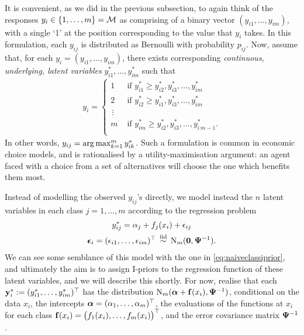 It is convenient, as we did in the previous subsection, to again think of the responses $y_i \in \{1,\dots,m\} = {\mathcal M}$ as comprising of a binary vector $(y_{i1},\dots,y_{im})$, with a single `1' at the position corresponding to the value that $y_i$ takes. 
In this formulation, each $y_{ij}$ is distributed as Bernoulli with probability $p_{ij}$. Now, assume that, for each $y_i = (y_{i1}, \dots, y_{im})$, there exists corresponding \emph{continuous, underlying, latent variables} $y_{i1}^*, \dots, y_{im}^*$ such that
\begin{align}\label{eq:latentmodel}
  y_i =
  \begin{cases}
    1 &\text{ if } y_{i1}^* \geq y_{i2}^*, y_{i3}^*, \dots, y_{im}^* \\
    2 &\text{ if } y_{i2}^* \geq y_{i1}^*, y_{i3}^*, \dots, y_{im}^* \\
    \,\vdots \\
    m &\text{ if } y_{im}^* \geq y_{i2}^*, y_{i3}^*, \dots, y_{i\,m-1}^*. \\
  \end{cases}  
\end{align}
In other words, 
$y_{ij} = \operatorname*{arg\,max}_{k=1}^m y_{ik}^*$.
Such a formulation is common in economic choice models, and is rationalised by a utility-maximisation argument: an agent faced with a choice from a set of alternatives will choose the one which benefits them most.

Instead of modelling the observed $y_{ij}$'s directly, we model instead the $n$ latent variables in each class $j=1,\dots,m$ according to the regression problem
\begin{equation}\label{eq:multinomial-latent}
  \begin{gathered}
    y_{ij}^* = \alpha_j + f_j(x_i) + \epsilon_{ij} \\
    {\bm\epsilon}_{i} = (\epsilon_{i1}, \dots, \epsilon_{im})^\top  \,\overset{\text{iid}}{\sim}\, \operatorname{N}_m({\mathbf 0}, {\bm\Psi}^{-1}). 
  \end{gathered}
\end{equation}
We can see some semblance of this model with the one in \cref{eq:naiveclassiprior}, and ultimately the aim is to assign I-priors to the regression function of these latent variables, and we will describe this shortly.
For now, realise that each ${\mathbf y}_i^* := (y_{i1}^*, \dots, y_{im}^*)^\top$ has the distribution $\operatorname{N}_m({\bm\alpha} + {\mathbf f}(x_i), {\bm\Psi}^{-1})$, conditional on the data $x_i$,  the intercepts ${\bm\alpha} = (\alpha_1,\dots,\alpha_m)^\top$, the evaluations of the functions at $x_i$ for each class ${\mathbf f}(x_i) = \big(f_1(x_i), \dots, f_m(x_i)\big)^\top$, and the error covariance matrix ${\bm\Psi}^{-1}$.

